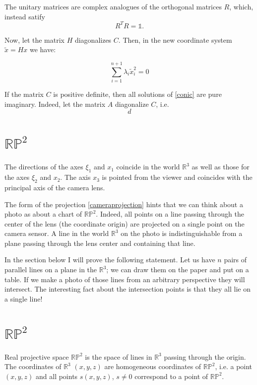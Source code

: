\documentclass[a4paper,10pt]{article}
\begin{document}
The unitary matrices are complex analogues of the orthogonal matrices $R$, which, instead satify 
\begin{equation}
 R^TR=\mathbb{1}.
\end{equation}


Now, let the matrix $H$ diagonalizes $C$. Then, in the new coordinate system $\tilde{x} = H x$ we have:

\begin{equation}
 \sum\limits_{i=1}^{n+1} \lambda_i \tilde{x}_i^2 = 0
\end{equation}



If the matrix $C$ is positive definite, then all solutions of \eqref{conic} are pure imaginary. Indeed, let the matrix $A$ diagonalize $C$, i.e.
\begin{equation}
d
\end{equation}
 

 





\section{$\mathbb{RP}^2$}


The directions of the axes $\xi_1$ and $x_1$ coincide in the world $\mathbb{R}^3$ as well as those for the axes  $\xi_2$ and $x_2$. The axis $x_3$ is pointed from the viewer and coincides with the principal axis of the camera lens. 

The form of the projection \eqref{cameraprojection} hints that we can think about a photo as about a chart of $\mathbb{RP}^2$. Indeed, all points on a line passing through the center of the lens (the coordinate origin) are projected on a single point on the camera sensor. A line in the world $\mathbb{R}^3$ on the photo is indistinguishable from a plane passing through the lens center and containing that line.  

In the section below I will prove the following statement. Let us have $n$ pairs of parallel lines on a plane in the $\mathbb{R}^3$; we can draw them on the paper and put on a table. If we make a photo of those lines from an arbitrary perspective they will intersect. The interesting fact about  the intersection points is that they all lie on a single line!

\section{$\mathbb{RP}^2$ }
 Real projective space $\mathbb{RP}^2$ is the space of lines in $\mathbb{R}^{3}$ passing through the origin. The coordinates of $\mathbb{R}^3$ $(x,y,z)$ are homogeneous coordinates of $\mathbb{RP}^2$, i.e. a point $(x,y,z)$ and all points $s(x,y,z)$, $s\neq 0$ correspond to a point of $\mathbb{RP}^2$.  
\end{document}

